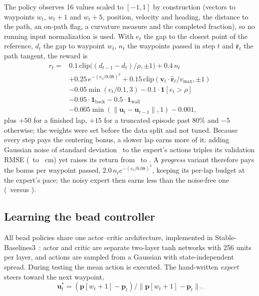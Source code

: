 \documentclass{IJCAS}
\begin{document}
The policy observes 16 values scaled to $[-1,1]$ by construction (vectors to waypoints $w_t$, $w_t+1$ and $w_t+5$, position, velocity and heading, the distance to the path, an on-path flag, a curvature measure and the completed fraction), so no running input normalization is used. With $e_t$ the gap to the closest point of the reference, $d_t$ the gap to waypoint $w_t$, $n_t$ the waypoints passed in step $t$ and $\hat{\mathbf{r}}_t$ the path tangent, the reward is
\begin{align}
r_t={}&0.1\,\mathrm{clip}\big((d_{t-1}-d_t)/\rho,\pm1\big)+0.4\,n_t\nonumber\\
&+0.25\,e^{-(e_t/0.08)^2}+0.15\,\mathrm{clip}(\mathbf{v}_t\!\cdot\hat{\mathbf{r}}_t/v_{\max},\pm1)\nonumber\\
&-0.05\min(e_t/0.1,3)-0.1\cdot\mathbf{1}[e_t>\rho]\nonumber\\
&-0.05\cdot\mathbf{1}_{\mathrm{back}}-0.5\cdot\mathbf{1}_{\mathrm{wall}}\nonumber\\
&-0.005\min(\|\mathbf{u}_t-\mathbf{u}_{t-1}\|,1)-0.001,\label{eq:reward}
\end{align}
plus $+50$ for a finished lap, $+15$ for a truncated episode past 80\% and $-5$ otherwise; the weights were set before the data split and not tuned. Because every step pays the centering bonus, a slower lap earns more of it: adding Gaussian noise of standard deviation \VexStd\ to the expert's actions triples its validation RMSE (\VexRmseZero\ to \VexRmseNoise~cm) yet raises its return from \VexRewBzero\ to \VexRewBnoise. A \emph{progress} variant therefore pays the bonus per waypoint passed, $2.0\,n_t e^{-(e_t/0.08)^2}$, keeping its per-lap budget at the expert's pace; the noisy expert then earns less than the noise-free one (\VexRewPnoise\ versus \VexRewPzero).

\subsection{Learning the bead controller}\label{sec:learning}
All bead policies share one actor--critic architecture, implemented in Stable-Baselines3~\cite{raffin2021}: actor and critic are separate two-layer tanh networks with 256 units per layer, and actions are sampled from a Gaussian with state-independent spread. During testing the mean action is executed. The hand-written \emph{expert} steers toward the next waypoint,
\begin{equation}
\mathbf{u}^{*}_t=(\mathbf{p}[w_t+1]-\mathbf{p}_t)/\|\mathbf{p}[w_t+1]-\mathbf{p}_t\|.\label{eq:expert}
\end{equation}
\end{document}
